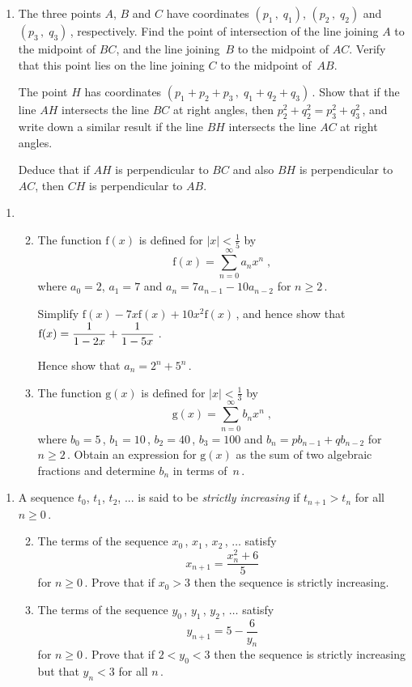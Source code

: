\documentclass[a4, 11pt]{report}
\newlength{\qspace}
\newcounter{qnumber}
\newenvironment{question}%
 {\vspace{\qspace}
  \begin{enumerate}[\bfseries 1\quad][10]%
    \setcounter{enumi}{\value{qnumber}}%
    \item%
 }
{
  \end{enumerate}
  \filbreak
  \stepcounter{qnumber}
 }
\newenvironment{questionparts}[1][1]%
 {
  \begin{enumerate}[\bfseries (i)]%
    \setcounter{enumii}{#1}
    \addtocounter{enumii}{-1}
    \setlength{\itemsep}{5mm}
    \setlength{\parskip}{8pt}
 }
 {
  \end{enumerate}
 }
\def\g{{\mathrm g}}
\def\f{{\mathrm f}}
\def\ge{\geqslant}
\newcommand{\ds}{\displaystyle}
\def\l{\left(}
\def\r{\right)}
\begin{document}
\begin{question}
The three points $A$, $B$ and $C$ have coordinates 
$\l p_1 \, , \; q_1 \r$, $\l p_2 \, , \; q_2 \r$ and 
$\l p_3 \, , \; q_3 \r\,$, respectively. 
Find the point of intersection of the line joining 
$A$ to the midpoint of $BC$, 
and the line joining~$B$ to the midpoint of $AC$. 
Verify that this point lies 
on the line joining $C$ to the midpoint of~$AB$.


The point $H$ has coordinates 
$\l p_1 + p_2 + p_3 \, , \; q_1 + q_2 + q_3 \r\,$. 
Show that if the line $AH$ intersects the line $BC$ at right angles, 
then $p_2^2 + q_2^2 = p_3^2 + q_3^2\,$, 
and write down  a similar result 
if the line $BH$ intersects the line $AC$ at right angles. 


Deduce that if $AH$ is perpendicular to $BC$ and 
also $BH$ is perpendicular to $AC$, then $CH$ is perpendicular to $AB$.
\end{question}
	
\begin{question}
\begin{questionparts}
\item
The function $\f(x)$ is defined for $\vert x \vert < \frac15$ by 
\[
\f(x) = \sum_{n=0}^\infty a_n x^n\;,
\]
where  
$a_0=2$, $a_1=7$ and 
$
a_n =7a_{n-1} - 10a_{n-2}
$ 
for $n\ge{2}\,$. 

Simplify $\f(x) - 7x\f(x) + 10x^2\f(x)\,$, 
and hence show that 
$\displaystyle\f(x) = {1\over 1-2x} + {1 \over 1-5x} \;$.


Hence show that $a_n=2^n + 5^n\,$.

\item The function $\g(x)$ is defined for $\vert x \vert < \frac13$ by 
\[
\g(x) = \sum_{n=0}^\infty b_n x^n \;,
\]
where $b_0=5\,$, $b_1 =10 \,$, $b_2=40\,$, $b_3=100$  
and  $b_n = pb_{n-1} + qb_{n-2}$ for $n\ge{2}\,$. 
Obtain an expression for $\g(x)$ as the sum of two algebraic fractions and 
determine $b_n$ in terms of~$n\,$.
\end{questionparts}
\end{question}
		
\begin{question}	
A sequence $t_0$, $t_1$, $t_2$, $...$ is said to be 
{\sl strictly increasing}  if $t_{n+1} > t_n$ for all $n\ge{0}\,$.

\begin{questionparts}
\item
The terms of the sequence $x_0\,$, $x_1\,$, $x_2\,$, $\ldots$ satisfy
$$
\ds x_{n+1}=\frac{x_n^2 +6}{5}
$$ for $n\ge{0}\,$. 
Prove that if $x_0 > 3$ then the sequence 
is strictly increasing.

\item The terms of the sequence $y_0\,$, $y_1\,$, $y_2\,$, $\ldots$
satisfy
$$
\ds y_{n+1}= 5-\frac 6 {y_n}
$$ 
for  $n\ge{0}\,$. 
Prove that if $2 < y_0 < 3$ 
then the sequence is strictly 
increasing but that $y_n<3$ for all $n\,$.
\end{questionparts}
\end{question}	
		
\end{document}
